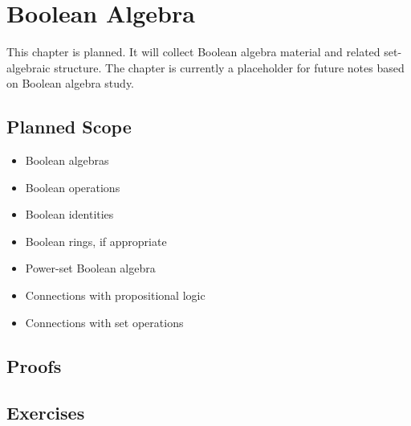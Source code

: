 \chapter{Boolean Algebra}

\begin{tcolorbox}[
  colback=gray!6,
  colframe=gray!40,
  arc=2pt,
  left=8pt, right=8pt, top=6pt, bottom=6pt,
  title={\small\textbf{Chapter Status}},
  fonttitle=\small\bfseries
]
This chapter is planned. It will collect Boolean algebra material and related
set-algebraic structure. The chapter is currently a placeholder for future
notes based on Boolean algebra study.
\end{tcolorbox}

\section*{Planned Scope}

\begin{itemize}
  \item Boolean algebras
  \item Boolean operations
  \item Boolean identities
  \item Boolean rings, if appropriate
  \item Power-set Boolean algebra
  \item Connections with propositional logic
  \item Connections with set operations
\end{itemize}



\clearpage
\section*{Proofs}


\clearpage
\section*{Exercises}

